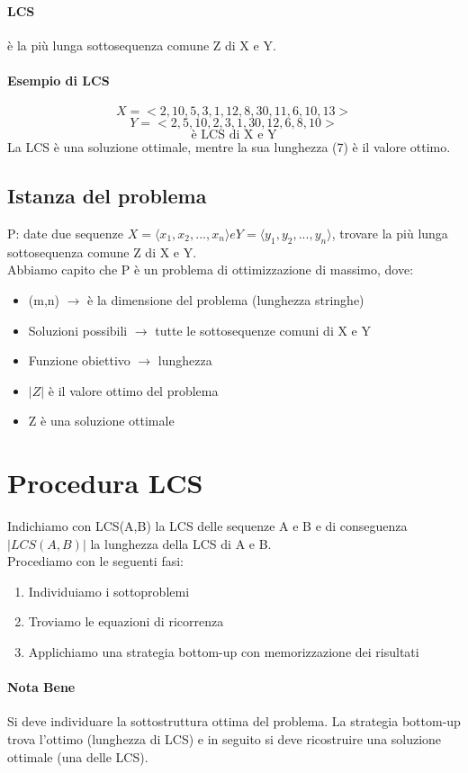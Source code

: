 \paragraph*{LCS} è la più lunga sottosequenza comune Z di X e Y.
\paragraph*{Esempio di LCS}
\[X = <2, 10, 5, 3, 1, 12, 8, 30, 11, 6, 10, 13>\]
\[Y = <2, 5, 10, 2, 3, 1, 30, 12, 6, 8, 10>\]
\[<2, 10, 3, 1, 12, 8, 10> \text{è LCS di X e Y}\]
La LCS è una soluzione ottimale, mentre la sua lunghezza (7) è il valore ottimo.\\
\subsection{Istanza del problema}
P: date due sequenze $X = ⟨x_1, x_2, ..., x_n⟩ e Y = ⟨y_1, y_2, ... , y_n⟩$, trovare la più lunga
sottosequenza comune Z di X e Y.\\
Abbiamo capito che P è un problema di ottimizzazione di massimo, dove:
\begin{itemize}
    \item (m,n) $\rightarrow$ è la dimensione del problema (lunghezza stringhe)
    \item Soluzioni possibili $\rightarrow$ tutte le sottosequenze comuni di X e Y
    \item Funzione obiettivo $\rightarrow$ lunghezza
    \item $|Z|$ è il valore ottimo del problema
    \item Z è una soluzione ottimale
\end{itemize}
\section{Procedura LCS}
Indichiamo con LCS(A,B) la LCS delle sequenze A e B e di conseguenza $|LCS(A,B)|$
 la lunghezza della LCS di A e B.\\
 Procediamo con le seguenti fasi:
 \begin{enumerate}
    \item Individuiamo i sottoproblemi
    \item Troviamo le equazioni di ricorrenza
    \item Applichiamo una strategia bottom-up con memorizzazione dei risultati
 \end{enumerate}
 \paragraph*{Nota Bene} Si deve individuare la sottostruttura ottima del problema. La strategia bottom-up trova
 l'ottimo (lunghezza di LCS) e in seguito si deve ricostruire una soluzione ottimale (una delle LCS).
